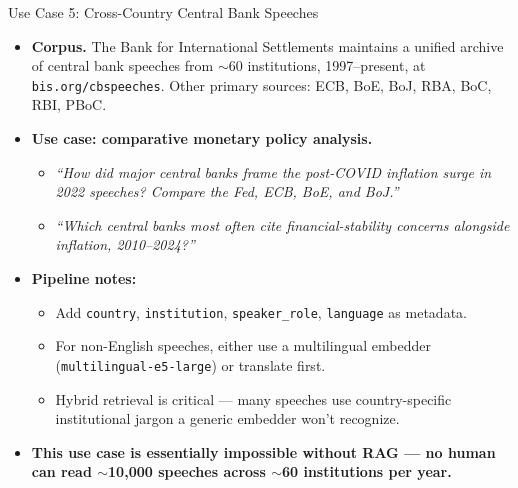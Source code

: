 \begin{frame}{Use Case 5: Cross-Country Central Bank Speeches}
\begin{itemize}
\item \textbf{Corpus.} The Bank for International Settlements maintains a unified archive of central bank speeches from $\sim$60 institutions, 1997--present, at \texttt{bis.org/cbspeeches}. Other primary sources: ECB, BoE, BoJ, RBA, BoC, RBI, PBoC.

\medskip
\item \textbf{Use case: comparative monetary policy analysis.}
\begin{itemize}
    \item \emph{``How did major central banks frame the post-COVID inflation surge in 2022 speeches? Compare the Fed, ECB, BoE, and BoJ.''}
    \item \emph{``Which central banks most often cite financial-stability concerns alongside inflation, 2010--2024?''}
\end{itemize}

\medskip
\item \textbf{Pipeline notes:}
\begin{itemize}
    \item Add \texttt{country}, \texttt{institution}, \texttt{speaker\_role}, \texttt{language} as metadata.
    \item For non-English speeches, either use a multilingual embedder (\texttt{multilingual-e5-large}) or translate first.
    \item Hybrid retrieval is critical --- many speeches use country-specific institutional jargon a generic embedder won't recognize.
\end{itemize}

\medskip
\item \textbf{This use case is essentially impossible without RAG --- no human can read $\sim$10{,}000 speeches across $\sim$60 institutions per year.}
\end{itemize}
\end{frame}

